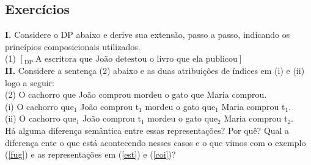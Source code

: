\bigskip

\begin{tcolorbox}[parbox=false,boxrule=0pt,sharp corners,breakable]

\section*{Exercícios}

\n\textbf{I.} Considere o DP abaixo e derive sua extensão, passo a passo, indicando os princípios composicionais
utilizados.\\


\n (1)  $[_{\text{DP}}\ \text{A escritora que João detestou o livro que ela publicou}]$ \\

\n\textbf{II.} Considere a sentença (2) abaixo e as duas atribuições de índices em (i) e (ii) logo a seguir:\\

\n (2) O cachorro que João comprou mordeu o gato que Maria comprou.\\

\n (i) O cachorro que$_{1}$ João comprou t$_{1}$ mordeu o gato que$_{1}$ Maria comprou t$_{1}$.\\

\n (ii) O cachorro que$_{1}$ João comprou t$_{1}$ mordeu o gato que$_{2}$ Maria comprou t$_{2}$.\\

\n Há alguma diferença semântica entre essas representações? Por quê? Qual a diferença ente o que está acontecendo nesses casos e o que vimos com o exemplo (\ref{fug}) e as representações em (\ref{est}) e (\ref{coi})?


\end{tcolorbox}














